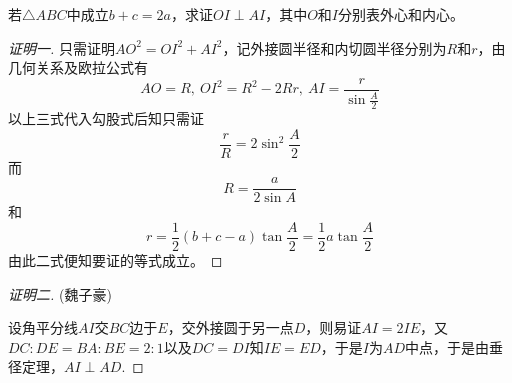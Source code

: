 \begin{exercise}
 若$\triangle ABC$中成立$b+c=2a$，求证$OI \perp AI$，其中$O$和$I$分别表外心和内心。
\end{exercise}

\exerciseFrom[\url{http://kuing.orzweb.net/viewthread.php?tid=4728}]

\exerciseSolvedDate[2017-06-29]

\begin{proof}[证明一]
  只需证明$AO^2=OI^2+AI^2$，记外接圆半径和内切圆半径分别为$R$和$r$，由几何关系及欧拉公式有
  \[ AO=R, \  OI^2=R^2-2Rr, \  AI=\frac{r}{\sin{\frac{A}{2}}} \]
  以上三式代入勾股式后知只需证
  \[ \frac{r}{R}=2\sin^2{\frac{A}{2}} \]
  而
  \[ R=\frac{a}{2\sin{A}} \]
  和
  \[ r=\frac{1}{2}(b+c-a)\tan{\frac{A}{2}}=\frac{1}{2}a\tan{\frac{A}{2}} \]
  由此二式便知要证的等式成立。
\end{proof}

\begin{proof}[证明二](魏子豪)

  设角平分线$AI$交$BC$边于$E$，交外接圆于另一点$D$，则易证$AI=2IE$，又$DC:DE=BA:BE=2:1$以及$DC=DI$知$IE=ED$，于是$I$为$AD$中点，于是由垂径定理，$AI \perp AD$.
\end{proof}

